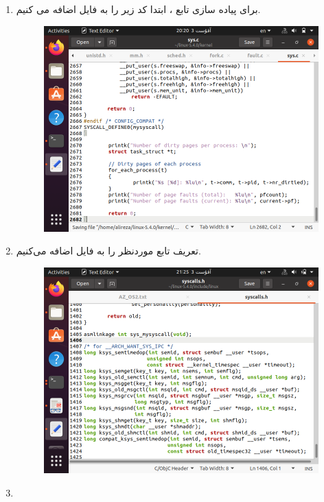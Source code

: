 \begin{itemize}
\begin{enumerate}
 			\item 
 			برای پیاده سازی تابع ، ابتدا کد زیر را به فایل  اضافه می کنیم.
 			\begin{figure}[!hpbt]
 				\centering
 				\includegraphics[scale=0.4]{img/pic8.png}
 			\end{figure}
 			\item 
 			 تعریف تابع  موردنظر را به فایل  اضافه می‌کنیم.
 			 \begin{figure}[!hpbt]
 			 	\centering
 			 	\includegraphics[scale=0.4]{img/pic9.png}
 			 \end{figure}
 			 \item 
 			 

\end{enumerate}
\end{itemize}
